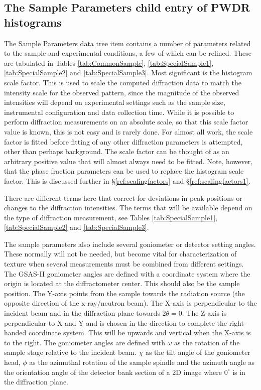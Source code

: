 \subsection{The Sample Parameters child entry of PWDR histograms}
\label{ref:SampleParms}
The Sample Parameters data tree item contains a number of parameters related to the sample and experimental conditions, a few of which can be refined. These are tabulated in Tables \ref{tab:CommonSample}, \ref{tab:SpecialSample1}, \ref{tab:SpecialSample2} and \ref{tab:SpecialSample3}.
Most significant is the histogram scale factor. This is used to scale the computed diffraction data to match the intensity scale for the observed pattern, since the magnitude of the observed intensities will depend on experimental settings such as the sample size, instrumental configuration and data collection time. 
While it is possible to perform diffraction measurements on an absolute scale, so that this scale factor value is known, this is not easy and is rarely done. For almost all work, the scale factor is fitted before fitting of any other diffraction parameters is attempted, other than perhaps background. The scale factor can be thought of as an arbitrary positive value that will almost always need to be fitted. Note, however, that the phase fraction parameters can be used to replace the histogram scale factor. This is discussed further in \S\ref{ref:scalingfactors} and \S\ref{ref:scalingfactors1}. 

There are different terms here that correct for deviations in peak positions or changes to the diffraction intensities. The terms that will be available depend on the type of diffraction measurement, see Tables \ref{tab:SpecialSample1}, \ref{tab:SpecialSample2} and \ref{tab:SpecialSample3}.

The sample parameters also include several goniometer or detector setting angles. These normally will not be needed, but become vital for characterization of texture when several measurements must be combined from different settings. The GSAS-II goniometer angles are defined with a coordinate system where the origin is located at the diffractometer center. This should also be the sample position. The 
Y-axis points from the sample towards the radiation source (the opposite direction of the x-ray/neutron beam). The X-axis is perpendicular to the incident beam and in the diffraction plane towards $2\theta =0$. The Z-axis is perpendicular to X and Y and is chosen in the direction to complete the right-handed coordinate system. This will be upwards and vertical when the X-axis is to the right. The goniometer angles are defined with $\omega$ as the rotation of the sample stage relative to the incident beam.
$\chi$ as the tilt angle of the goniometer head, $\phi$ as the azimuthal rotation of the sample spindle and the azimuth angle as the orientation angle of the detector bank section of a 2D image where $0^\circ$ is in the diffraction plane. 

